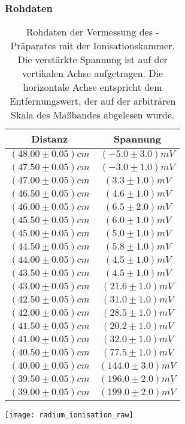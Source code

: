 \documentclass{../Misc/MontavonLaTeX/Montavon}
\newcommand{\halfwidth}{0.48\textwidth}
\newcommand{\fullwidth}{1.0\textwidth}
\begin{document}
\subsubsection{Rohdaten}
\begin{table}[htbp]
\begin{minipage}{\halfwidth}
\begin{tabular}{|c|c|}
\hline
Distanz & Spannung \\
\hline
$(48.00 \pm 0.05) \unit{cm}$ & $(-5.0 \pm 3.0) \unit{mV}$ \\
$(47.50 \pm 0.05) \unit{cm}$ & $(-3.0 \pm 1.0) \unit{mV}$ \\
$(47.00 \pm 0.05) \unit{cm}$ & $(3.3 \pm 1.0) \unit{mV}$ \\
$(46.50 \pm 0.05) \unit{cm}$ & $(4.6 \pm 1.0) \unit{mV}$ \\
$(46.00 \pm 0.05) \unit{cm}$ & $(6.5 \pm 2.0) \unit{mV}$ \\
$(45.50 \pm 0.05) \unit{cm}$ & $(6.0 \pm 1.0) \unit{mV}$ \\
$(45.00 \pm 0.05) \unit{cm}$ & $(5.0 \pm 1.0) \unit{mV}$ \\
$(44.50 \pm 0.05) \unit{cm}$ & $(5.8 \pm 1.0) \unit{mV}$ \\
$(44.00 \pm 0.05) \unit{cm}$ & $(4.5 \pm 1.0) \unit{mV}$ \\
$(43.50 \pm 0.05) \unit{cm}$ & $(4.5 \pm 1.0) \unit{mV}$ \\
$(43.00 \pm 0.05) \unit{cm}$ & $(21.6 \pm 1.0) \unit{mV}$ \\
$(42.50 \pm 0.05) \unit{cm}$ & $(31.0 \pm 1.0) \unit{mV}$ \\
$(42.00 \pm 0.05) \unit{cm}$ & $(28.5 \pm 1.0) \unit{mV}$ \\
$(41.50 \pm 0.05) \unit{cm}$ & $(20.2 \pm 1.0) \unit{mV}$ \\
$(41.00 \pm 0.05) \unit{cm}$ & $(32.0 \pm 1.0) \unit{mV}$ \\
$(40.50 \pm 0.05) \unit{cm}$ & $(77.5 \pm 1.0) \unit{mV}$ \\
$(40.00 \pm 0.05) \unit{cm}$ & $(144.0 \pm 3.0) \unit{mV}$ \\
$(39.50 \pm 0.05) \unit{cm}$ & $(196.0 \pm 2.0) \unit{mV}$ \\
$(39.00 \pm 0.05) \unit{cm}$ & $(199.0 \pm 2.0) \unit{mV}$ \\
\hline
\end{tabular}
\end{minipage}
\begin{minipage}{\halfwidth}
\centering
\texttt{[image: radium\_ionisation\_raw]}
\end{minipage}
\caption{Rohdaten der Vermessung des -Präparates mit der Ionisationskammer. Die verstärkte Spannung ist auf der vertikalen Achse aufgetragen. Die horizontale Achse entspricht dem Entfernungswert, der auf der arbiträren Skala des Maßbandes abgelesen wurde.}
\label{fig:radium_ionisation_raw}
\end{table}
\end{document}
